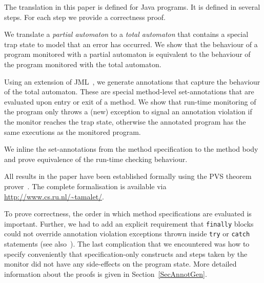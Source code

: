 The translation in this paper is defined for Java programs. It is
defined in several steps. For each step we provide a correctness
proof.
\begin{inparaenum}
\item We translate a \emph{partial automaton} to a \emph{total automaton}
that contains a special trap state to model that an error has
occurred.
We show that the behaviour of a program monitored with a partial
automaton is equivalent to the behaviour of the program monitored with
the total automaton.
\item Using an extension of JML~\cite{LeavensPCCRCK05}, we generate annotations
that capture the behaviour of the total automaton. These are special
method-level set-annotations that are evaluated upon entry or exit of
a method.  We show that run-time monitoring of the program only throws
a (new) exception to signal an annotation violation if the monitor
reaches the trap state, otherwise the annotated program has the same
executions as the monitored program.
\item We inline the set-annotations from the method specification
to the method body and prove equivalence of the run-time checking behaviour.
\end{inparaenum}
All results in the paper have been established formally using the PVS
theorem prover~\cite{OwreRRSS96}. The complete formalisation is
available via \url{http://www.cs.ru.nl/~tamalet/}. 

To prove
correctness, the order in which method specifications are evaluated is
important. Further, we had to add an explicit requirement that
\texttt{finally} blocks could not override annotation violation
exceptions thrown inside \texttt{try} or
\texttt{catch} statements (see also~\cite{Huisman08}). The last
complication that we encountered was how to specify conveniently that
specification-only constructs and steps taken by the monitor did not
have any side-effects on the program state. More detailed information
about the proofs is given in Section~\ref{SecAnnotGen}.

